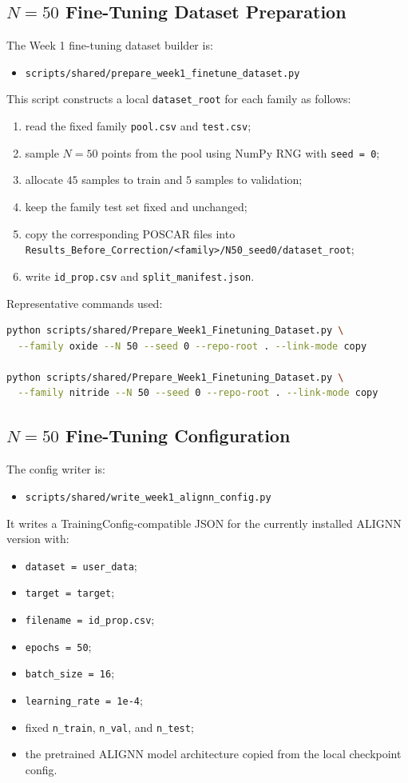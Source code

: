\documentclass[11pt]{article}
\begin{document}
\subsection{$N=50$ Fine-Tuning Dataset Preparation}
The Week 1 fine-tuning dataset builder is:
\begin{itemize}
  \item \texttt{scripts/shared/prepare\_week1\_finetune\_dataset.py}
\end{itemize}

This script constructs a local \texttt{dataset\_root} for each family as follows:
\begin{enumerate}
  \item read the fixed family \texttt{pool.csv} and \texttt{test.csv};
  \item sample $N=50$ points from the pool using NumPy RNG with \texttt{seed = 0};
  \item allocate $45$ samples to train and $5$ samples to validation;
  \item keep the family test set fixed and unchanged;
  \item copy the corresponding POSCAR files into \texttt{Results_Before_Correction/<family>/N50\_seed0/dataset\_root};
  \item write \texttt{id\_prop.csv} and \texttt{split\_manifest.json}.
\end{enumerate}

Representative commands used:
\begin{lstlisting}[language=bash]
python scripts/shared/Prepare_Week1_Finetuning_Dataset.py \
  --family oxide --N 50 --seed 0 --repo-root . --link-mode copy

python scripts/shared/Prepare_Week1_Finetuning_Dataset.py \
  --family nitride --N 50 --seed 0 --repo-root . --link-mode copy
\end{lstlisting}

\subsection{$N=50$ Fine-Tuning Configuration}
The config writer is:
\begin{itemize}
  \item \texttt{scripts/shared/write\_week1\_alignn\_config.py}
\end{itemize}

It writes a TrainingConfig-compatible JSON for the currently installed ALIGNN version with:
\begin{itemize}
  \item \texttt{dataset = user\_data};
  \item \texttt{target = target};
  \item \texttt{filename = id\_prop.csv};
  \item \texttt{epochs = 50};
  \item \texttt{batch\_size = 16};
  \item \texttt{learning\_rate = 1e-4};
  \item fixed \texttt{n\_train}, \texttt{n\_val}, and \texttt{n\_test};
  \item the pretrained ALIGNN model architecture copied from the local checkpoint config.
\end{itemize}
\end{document}
